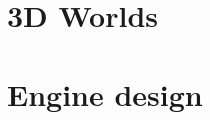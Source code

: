 \documentclass[11pt, oldfontcommands, oneside, a4paper]{memoir}
\begin{document}
\part{3D Worlds}







\part{Engine design}

\printindex
\end{document}

